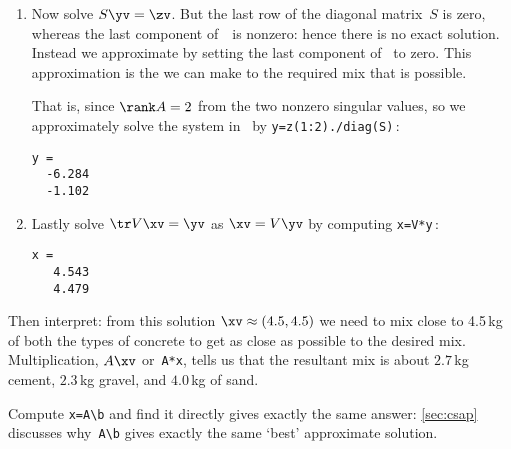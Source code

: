 \begin{reduce}
\begin{example}
\begin{solution}
\begin{enumerate}
\item Now solve \(S\yv=\zv\).
But the last row of the diagonal matrix~\(S\) is zero, whereas the last component of~\zv\ is nonzero: hence there is no exact solution. 
Instead we approximate by setting the last component of \zv\ to zero.
This approximation is the \emph{} we can make to the required mix that is possible.

That is, since \(\rank A=2\) from the two nonzero singular values, so we approximately solve the system in \script\ by \verb|y=z(1:2)./diag(S)|\,:
\begin{verbatim}
y =
  -6.284
  -1.102
\end{verbatim}

\item Lastly solve \(\tr V\xv=\yv\) as \(\xv=V\yv\) by computing \verb|x=V*y|\,:
\begin{verbatim}
x =
   4.543
   4.479
\end{verbatim}
\end{enumerate}
Then interpret: from this solution \(\xv\approx(4.5,4.5)\) we need to mix close to 4.5\,kg of both the types of concrete to get as close as possible to the desired mix.
Multiplication, \(A\xv\) or~\verb|A*x|, tells us that the resultant mix is about \(2.7\)\,kg cement, \(2.3\)\,kg gravel, and \(4.0\)\,kg of sand.

Compute \verb|x=A\b| and find it directly gives exactly the same answer: \cref{sec:csap} discusses why~\verb|A\b| gives exactly the same `best' approximate solution. 
\end{solution}
\end{example}
\end{reduce}






